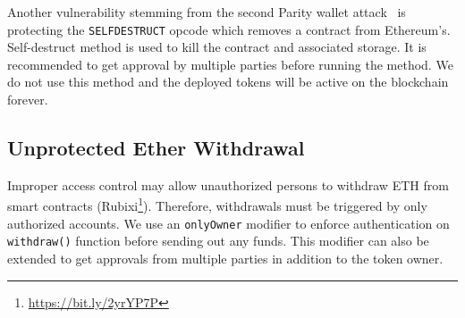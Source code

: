 Another vulnerability stemming from the second Parity wallet attack~\cite{ParitySecondHack} is protecting the \texttt{SELFDESTRUCT} opcode which removes a contract from Ethereum's. Self-destruct method is used to kill the contract and associated storage. It is recommended to get approval by multiple parties before running the method. We do not use this method and the deployed \erc tokens will be active on the blockchain forever.

\subsection{Unprotected Ether Withdrawal}

Improper access control may allow unauthorized persons to withdraw ETH from smart contracts (\cf Rubixi\footnote{\url{https://bit.ly/2yrYP7P}}). Therefore, withdrawals must be triggered by only authorized accounts. We use an \texttt{onlyOwner} modifier to enforce authentication on \texttt{withdraw()} function before sending out any funds. {\chg This modifier can also be extended to get approvals from multiple parties in addition to the token owner.}